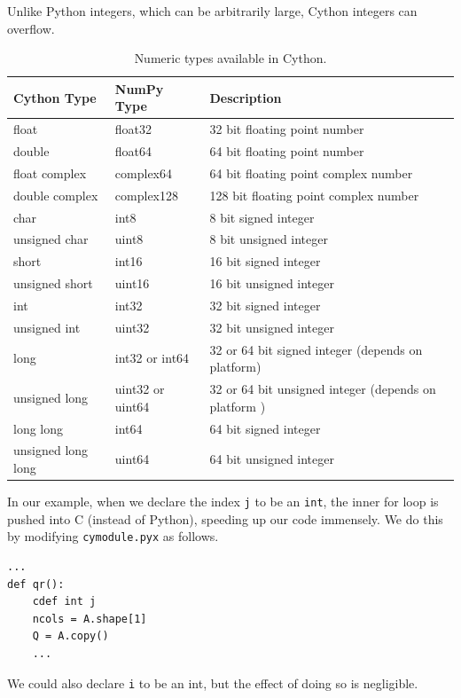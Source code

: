 \begin{warn}
Unlike Python integers, which can be arbitrarily large, Cython integers can overflow.
\end{warn} 

\begin{table}
\begin{center}
\begin{tabular}{|p{2.8cm}|p{2.5cm}|p{6cm}|}
\hline
Cython Type & NumPy Type& Description \\
\hline
float & float32 & 32 bit floating point number \\
double & float64 & 64 bit floating point number \\
float complex & complex64 & 64 bit floating point complex number \\
double complex & complex128 & 128 bit floating point complex number \\
char & int8 & 8 bit signed integer \\
unsigned char & uint8 & 8 bit unsigned integer \\
short & int16 & 16 bit signed integer \\
unsigned short & uint16 & 16 bit unsigned integer \\
int & int32 & 32 bit signed integer \\
unsigned int & uint32 & 32 bit unsigned integer \\
long & int32 or int64 & 32 or 64 bit signed integer (depends on platform) \\
unsigned long & uint32 or uint64 & 32 or 64 bit unsigned integer (depends on platform ) \\
long long & int64 & 64 bit signed integer \\
unsigned long long & uint64 & 64 bit unsigned integer \\
\hline
\end{tabular}
\end{center}
\caption{Numeric types available in Cython.}
\label{table:cython_types}
\end{table}

In our example, when we declare the index \texttt{j} to be an \texttt{int}, the inner for loop is pushed into C (instead of Python), speeding up our code immensely.
We do this by modifying \texttt{cymodule.pyx} as follows.
\begin{lstlisting}
...
def qr():
    cdef int j
    ncols = A.shape[1]
    Q = A.copy()
    ...
\end{lstlisting}

We could also declare \texttt{i} to be an int, but the effect of doing so is negligible.

